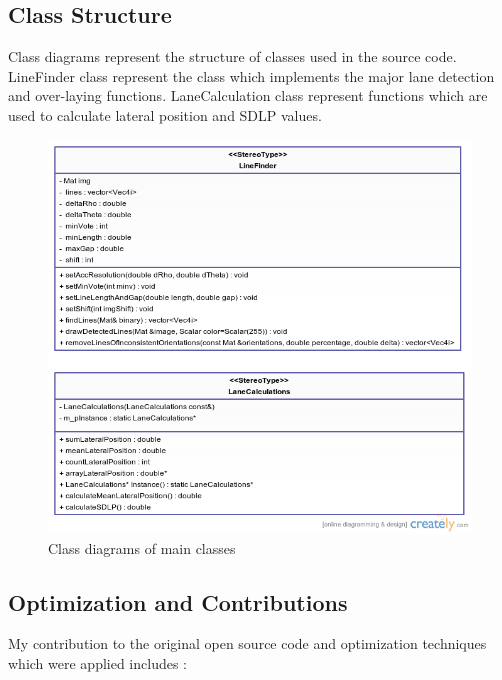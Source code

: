 \subsection{Class Structure}

Class diagrams represent the structure of classes used in the source code. LineFinder class represent the class which implements the major lane detection and over-laying functions. LaneCalculation class represent functions which are used to calculate lateral position and SDLP values.

\begin{figure}
\begin{center}
    \includegraphics[scale=0.6]{img/lane14.png}
\end{center}
\caption{Class diagrams of main classes}
\end{figure}

\subsection{Optimization and Contributions}

My contribution to the original open source code and optimization techniques which were applied includes :

